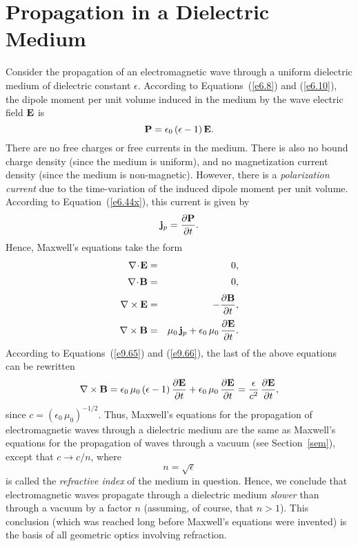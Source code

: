 \section{Propagation in a Dielectric Medium}
Consider the propagation of an electromagnetic wave through a
uniform dielectric medium of dielectric constant $\epsilon$. 
According to Equations~(\ref{e6.8}) and (\ref{e6.10}), the dipole moment
per unit volume induced in the medium by the wave electric field ${\bf E}$
is
\begin{equation}\label{e9.65}
{\bf P} = \epsilon_0\,(\epsilon -1)\,{\bf E}.
\end{equation}
There are no free charges or free currents in the medium. There is also
no bound charge density (since the medium is uniform), and no magnetization
current density (since the medium is non-magnetic). However, there
is a {\em polarization current}\/ due to the time-variation of the induced
dipole moment per unit volume. According to Equation~(\ref{e6.44x}), this
current is given by
\begin{equation}\label{e9.66}
{\bf j}_p = \frac{\partial{\bf P}}{\partial t}. 
\end{equation}
Hence, Maxwell's equations take the form
\begin{eqnarray}
\nabla\!\cdot\!{\bf E} &=& 0,\\[0.5ex]
 \nabla\!\cdot\!{\bf B} &=&0,\\[0.5ex]
\nabla\times {\bf E} &=&-\frac{\partial {\bf B}}{\partial t},\\[0.5ex]
\nabla\times{\bf B} &=& \mu_0\,{\bf j}_p+ \epsilon_0\,\mu_0\,\frac{\partial {\bf E}}{\partial t}.
\end{eqnarray}
According to Equations~(\ref{e9.65}) and (\ref{e9.66}), the last of the above
equations can be rewritten
\begin{equation}
\nabla\times{\bf B} =\epsilon_0\,\mu_0\,(\epsilon-1)\,\frac{\partial {\bf E}}{\partial t}+ \epsilon_0\,\mu_0\,\frac{\partial {\bf E}}{\partial t}=
\frac{\epsilon}{c^2}\,\frac{\partial {\bf E}}{\partial t},
\end{equation}
since $c= (\epsilon_0\,\mu_0)^{-1/2}$.
Thus, Maxwell's equations for the propagation of electromagnetic waves
through a dielectric medium are the same as Maxwell's equations
for the propagation of waves through a vacuum (see Section~\ref{sem}), except that
$c\rightarrow c/n$,
where
\begin{equation}
n = \sqrt{\epsilon}
\end{equation}
is called the {\em refractive index} of the medium in question. Hence,
we conclude that electromagnetic waves propagate through a dielectric
medium {\em slower}\/ than through a vacuum by a factor $n$ (assuming,
of course, that $n>1$). This conclusion (which was reached
long before Maxwell's equations were invented) is the basis of all
geometric optics involving refraction.

